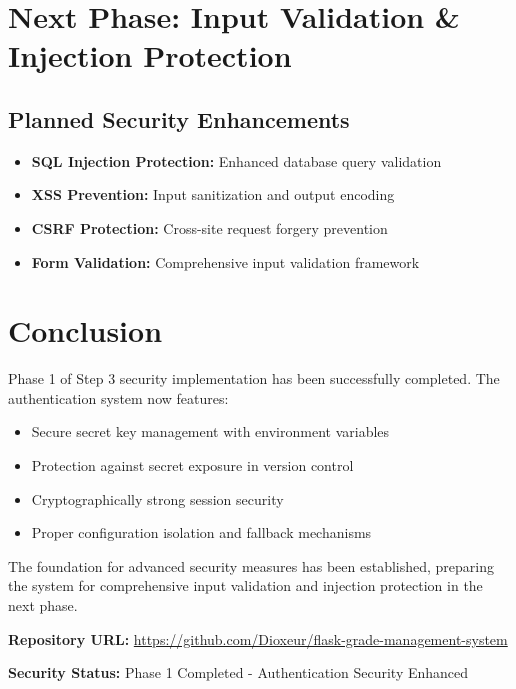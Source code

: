 \documentclass[12pt,a4paper]{article}
\begin{document}
\section{Next Phase: Input Validation \& Injection Protection}

\subsection{Planned Security Enhancements}
\begin{itemize}
    \item \textbf{SQL Injection Protection:} Enhanced database query validation
    \item \textbf{XSS Prevention:} Input sanitization and output encoding
    \item \textbf{CSRF Protection:} Cross-site request forgery prevention
    \item \textbf{Form Validation:} Comprehensive input validation framework
\end{itemize}

\section{Conclusion}

Phase 1 of Step 3 security implementation has been successfully completed. The authentication system now features:

\begin{itemize}
    \item Secure secret key management with environment variables
    \item Protection against secret exposure in version control
    \item Cryptographically strong session security
    \item Proper configuration isolation and fallback mechanisms
\end{itemize}

The foundation for advanced security measures has been established, preparing the system for comprehensive input validation and injection protection in the next phase.

\vspace{1cm}

\noindent\textbf{Repository URL:} \url{https://github.com/Dioxeur/flask-grade-management-system}

\noindent\textbf{Security Status:} Phase 1 Completed - Authentication Security Enhanced
\end{document}
